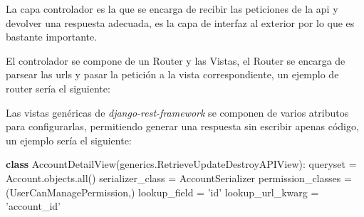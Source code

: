 \documentclass[12pt,a4paperpaper,]{report}
\newenvironment{Shaded}{}{}
\newcommand{\KeywordTok}[1]{\textcolor[rgb]{0.00,0.44,0.13}{\textbf{#1}}}
\newcommand{\StringTok}[1]{\textcolor[rgb]{0.25,0.44,0.63}{#1}}
\newcommand{\VerbatimStringTok}[1]{\textcolor[rgb]{0.25,0.44,0.63}{#1}}
\newcommand{\OperatorTok}[1]{\textcolor[rgb]{0.40,0.40,0.40}{#1}}
\newcommand{\BuiltInTok}[1]{#1}
\newcommand{\NormalTok}[1]{#1}
\begin{document}
La capa controlador es la que se encarga de recibir las peticiones de la
api y devolver una respuesta adecuada, es la capa de interfaz al
exterior por lo que es bastante importante.

El controlador se compone de un Router y las Vistas, el Router se
encarga de parsear las urls y pasar la petición a la vista
correspondiente, un ejemplo de router sería el siguiente:

\begin{Shaded}
\end{Shaded}

Las vistas genéricas de \emph{django-rest-framework} se componen de
varios atributos para configurarlas, permitiendo generar una respuesta
sin escribir apenas código, un ejemplo sería el siguiente:

\begin{Shaded}
\begin{Highlighting}[]

\KeywordTok{class}\NormalTok{ AccountDetailView(generics.RetrieveUpdateDestroyAPIView):}
\NormalTok{    queryset }\OperatorTok{=}\NormalTok{ Account.objects.}\BuiltInTok{all}\NormalTok{()}
\NormalTok{    serializer_class }\OperatorTok{=}\NormalTok{ AccountSerializer}
\NormalTok{    permission_classes }\OperatorTok{=}\NormalTok{ (UserCanManagePermission,)}
\NormalTok{    lookup_field }\OperatorTok{=} \StringTok{'id'}
\NormalTok{    lookup_url_kwarg }\OperatorTok{=} \StringTok{'account_id'}
\end{Highlighting}
\end{Shaded}
\end{document}
